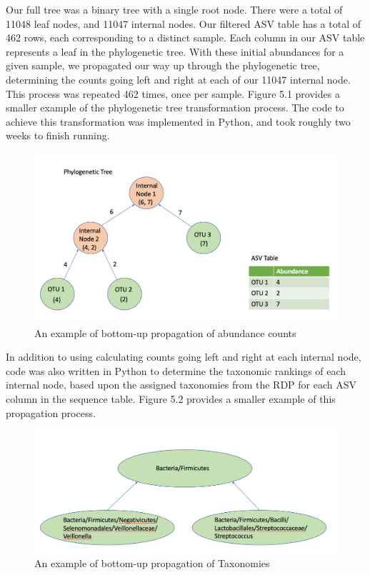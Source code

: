 \documentclass[12pt,twoside]{dukestatscithesis}
\begin{document}
Our full tree was a binary tree with a single root node. There were a
total of 11048 leaf nodes, and 11047 internal nodes. Our filtered ASV
table has a total of 462 rows, each corresponding to a distinct sample.
Each column in our ASV table represents a leaf in the phylogenetic tree.
With these initial abundances for a given sample, we propagated our way
up through the phylogenetic tree, determining the counts going left and
right at each of our 11047 internal node. This process was repeated 462
times, once per sample. Figure 5.1 provides a smaller example of the
phylogenetic tree transformation process. The code to achieve this
transformation was implemented in Python, and took roughly two weeks to
finish running.
\begin{figure}
\includegraphics[width=700px]{figure/figure15} \caption{An example of bottom-up propagation of abundance counts}\label{fig:figure15}
\end{figure}
In addition to using calculating counts going left and right at each
internal node, code was also written in Python to determine the
taxonomic rankings of each internal node, based upon the assigned
taxonomies from the RDP for each ASV column in the sequence table.
Figure 5.2 provides a smaller example of this propagation process.
\begin{figure}
\includegraphics[width=700px]{figure/figure16} \caption{An example of bottom-up propagation of Taxonomies}\label{fig:figure16}
\end{figure}
\end{document}
